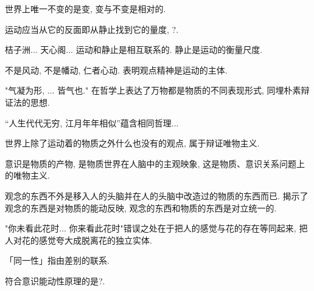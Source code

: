 \documentclass{ctexart}
\begin{document}
\begin{sample}
    \begin{ex}
        世界上唯一不变的是变, {\color{red}变与不变是相对的}.
    \end{ex}
    \begin{ex}
        运动应当从它的反面即从静止找到它的量度, {\color{red}?}.
    \end{ex}
    \begin{ex}
        桔子洲... 天心阁... 运动和静止是相互联系的. {\color{red}静止是运动的衡量尺度}.
    \end{ex}
    \begin{ex}
        不是风动, 不是幡动, 仁者心动. 表明观点{\color{red}精神是运动的主体}.
    \end{ex}
    \begin{ex}
        "气凝为形, ... 皆气也." 在哲学上表达了{\color{red}万物都是物质的不同表现形式}, 同埋{\color{red}朴素辩证法的思想}.
    \end{ex}
    \begin{ex}
        “人生代代无穷, 江月年年相似”蕴含相同哲理...
    \end{ex}
    \begin{ex}
        世界上除了运动着的物质之外什么也没有的观点, 属于{\color{red}辩证唯物主义}.
    \end{ex}
\end{sample}
意识是物质的产物, 是物质世界在人脑中的主观映象, 这是物质、意识关系问题上的唯物主义.
\begin{sample}
    \begin{ex}
        观念的东西不外是移入人的头脑并在人的头脑中改造过的物质的东西而已. 揭示了{\color{red}观念的东西是对物质的能动反映}, {\color{red}观念的东西和物质的东西是对立统一的}.
    \end{ex}
\end{sample}
\begin{sample}
    \begin{ex}
        "你未看此花时... 你来看此花时"错误之处在于{\color{red}把人的感觉与花的存在等同起来}, {\color{red}把人对花的感觉夸大成脱离花的独立实体}.
    \end{ex}
\end{sample}
\begin{finale}
    「同一性」指由差别的联系.
\end{finale}
\begin{sample}
    \begin{ex}
        符合意识能动性原理的是{\color{red}?}.
    \end{ex}
\end{sample}



\end{document}
